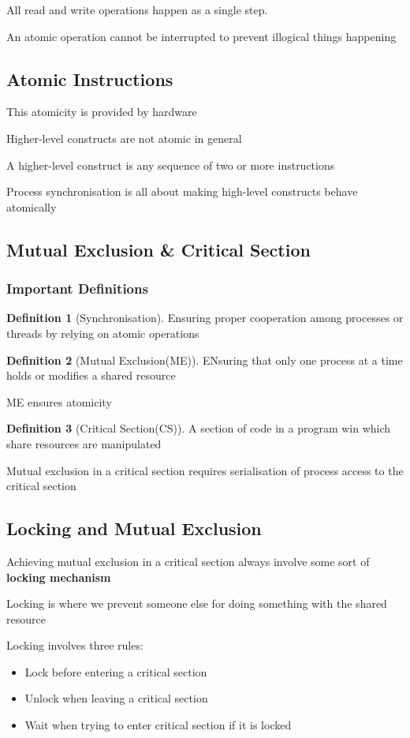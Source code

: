 \documentclass[11pt]{article}
\theoremstyle{definition}
\newtheorem{defn}{Definition}
\begin{document}
        
         All read and write operations happen as a single step.

         An atomic operation cannot be interrupted to prevent illogical things happening
    \subsection{Atomic Instructions}
    This atomicity is provided by hardware

    
    Higher-level constructs are not atomic in general


    A higher-level construct is any sequence of two or more instructions


    \note Process synchronisation is all about making high-level constructs behave atomically

    \subsection{Mutual Exclusion \& Critical Section}
    \subsubsection{Important Definitions}
    \begin{defn}[Synchronisation]
        Ensuring proper cooperation among processes or threads by relying on atomic operations
    \end{defn}
    \begin{defn}[Mutual Exclusion(ME)]
        ENsuring that only one process at a time holds or modifies a shared resource
    \end{defn}


    ME ensures atomicity
    \begin{defn} [Critical Section(CS)]
        A section of code in a program win which share resources are manipulated
    \end{defn}
    Mutual exclusion in a critical section requires serialisation of process access to the critical section
    \subsection{Locking and Mutual Exclusion}
        Achieving mutual exclusion in a critical section always involve some sort of \textbf{locking mechanism}


        Locking is where we prevent someone else for doing something with the shared resource


        Locking involves three rules:
        \begin{itemize}
            \item Lock before entering a critical section
            \item Unlock when leaving a critical section
            \item Wait when trying to enter critical section if it is locked
        \end{itemize}
        \clearpage
\end{document}
